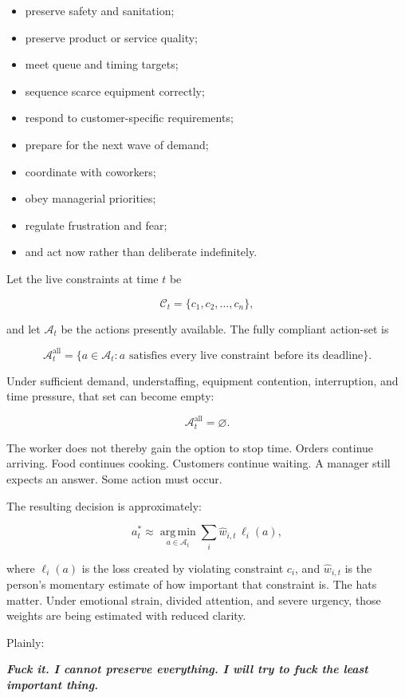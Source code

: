 \documentclass[11pt,oneside]{article}
\providecommand{\tightlist}{%
  \setlength{\itemsep}{0.22em}\setlength{\parskip}{0pt}}
\renewenvironment{quote}
  {\begin{tcolorbox}[
      enhanced,
      breakable,
      colback=ManifestLight,
      colframe=ManifestRule,
      boxrule=0pt,
      leftrule=3pt,
      arc=0pt,
      outer arc=0pt,
      left=10pt,right=10pt,top=8pt,bottom=8pt,
      before skip=0.8em,after skip=0.8em
    ]\itshape}
  {\end{tcolorbox}}
\begin{document}
\begin{itemize}
\tightlist
\item
  preserve safety and sanitation;
\item
  preserve product or service quality;
\item
  meet queue and timing targets;
\item
  sequence scarce equipment correctly;
\item
  respond to customer-specific requirements;
\item
  prepare for the next wave of demand;
\item
  coordinate with coworkers;
\item
  obey managerial priorities;
\item
  regulate frustration and fear;
\item
  and act now rather than deliberate indefinitely.
\end{itemize}

Let the live constraints at time \(t\) be

\[
\mathcal C_t = \{c_1,c_2,\ldots,c_n\},
\]

and let \(\mathcal A_t\) be the actions presently available. The fully
compliant action-set is

\[
\mathcal A_t^{\mathrm{all}}
=
\{a\in\mathcal A_t : a\text{ satisfies every live constraint before its deadline}\}.
\]

Under sufficient demand, understaffing, equipment contention,
interruption, and time pressure, that set can become empty:

\[
\mathcal A_t^{\mathrm{all}}=\varnothing.
\]

The worker does not thereby gain the option to stop time. Orders
continue arriving. Food continues cooking. Customers continue waiting. A
manager still expects an answer. Some action must occur.

The resulting decision is approximately:

\[
a_t^*
\approx
\operatorname*{arg\,min}_{a\in\mathcal A_t}
\sum_i \widehat w_{i,t}\,\ell_i(a),
\]

where \(\ell_i(a)\) is the loss created by violating constraint \(c_i\),
and \(\widehat w_{i,t}\) is the person's momentary estimate of how
important that constraint is. The hats matter. Under emotional strain,
divided attention, and severe urgency, those weights are being estimated
with reduced clarity.

Plainly:

\begin{quote}
\textbf{Fuck it. I cannot preserve everything. I will try to fuck the
least important thing.}
\end{quote}
\end{document}
